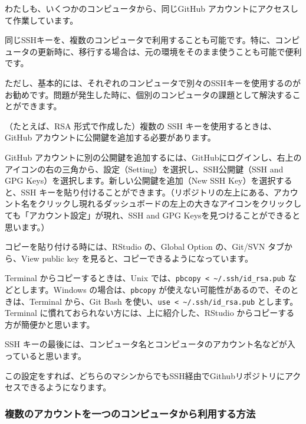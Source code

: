 \documentclass[
]{bxjsbook}
\theoremstyle{definition}
\theoremstyle{definition}
\theoremstyle{definition}
\theoremstyle{definition}
\theoremstyle{remark}
\begin{document}
わたしも、いくつかのコンピュータから、同じGitHub アカウントにアクセスして作業しています。

同じSSHキーを、複数のコンピュータで利用することも可能です。特に、コンピュータの更新時に、移行する場合は、元の環境をそのまま使うことも可能で便利です。

ただし、基本的には、それぞれのコンピュータで別々のSSHキーを使用するのがお勧めです。問題が発生した時に、個別のコンピュータの課題として解決することができます。

（たとえば、RSA 形式で作成した）複数の SSH キーを使用するときは、GitHub アカウントに公開鍵を追加する必要があります。

GitHub アカウントに別の公開鍵を追加するには、GitHubにログインし、右上のアイコンの右の三角から、設定（Setting）を選択し、SSH公開鍵（SSH and GPG Keys）を選択します。新しい公開鍵を追加（New SSH Key）を選択すると、SSH キーを貼り付けることができます。（リポジトリの左上にある、アカウント名をクリックし現れるダッシュボードの左上の大きなアイコンをクリックしても「アカウント設定」が現れ、SSH and GPG Keysを見つけることができると思います。）

コピーを貼り付ける時には、RStudio の、Global Option の、Git/SVN タブから、View public key を見ると、コピーできるようになっています。

Terminal からコピーするときは、Unix では、\texttt{pbcopy\ \textless{}\ \textasciitilde{}/.ssh/id\_rsa.pub} などとします。Windows の場合は、\texttt{pbcopy} が使えない可能性があるので、そのときは、Terminal から、Git Bash を使い、\texttt{use\ \textless{}\ \textasciitilde{}/.ssh/id\_rsa.pub} とします。Terminal に慣れておられない方には、上に紹介した、RStudio からコピーする方が簡便かと思います。

SSH キーの最後には、コンピュータ名とコンピュータのアカウント名などが入っていると思います。

この設定をすれば、どちらのマシンからでもSSH経由でGithubリポジトリにアクセスできるようになります。

\hypertarget{ux8907ux6570ux306eux30a2ux30abux30a6ux30f3ux30c8ux3092ux4e00ux3064ux306eux30b3ux30f3ux30d4ux30e5ux30fcux30bfux304bux3089ux5229ux7528ux3059ux308bux65b9ux6cd5}{%
\subsubsection{複数のアカウントを一つのコンピュータから利用する方法}\label{ux8907ux6570ux306eux30a2ux30abux30a6ux30f3ux30c8ux3092ux4e00ux3064ux306eux30b3ux30f3ux30d4ux30e5ux30fcux30bfux304bux3089ux5229ux7528ux3059ux308bux65b9ux6cd5}}
\end{document}
